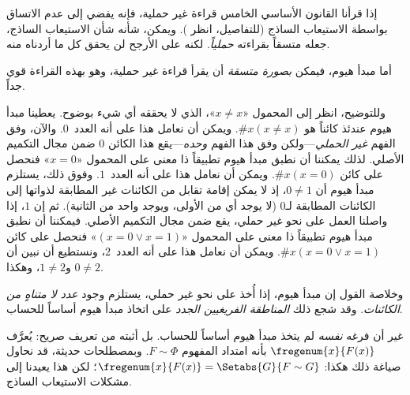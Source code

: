 \documentclass[../../../include/open-logic-section]{subfiles}
\begin{document}
إذا قرأنا القانون الأساسي الخامس قراءة غير حملية، فإنه يفضي إلى عدم
الاتساق بواسطة الاستيعاب الساذج (للتفاصيل، انظر
). ويمكن، شأنه شأن الاستيعاب الساذج، جعله متسقاً
بقراءته \emph{حملياً}. لكنه على الأرجح لن يحقق كل ما أردناه منه.

أما مبدأ هيوم، فيمكن \emph{بصورة متسقة} أن يقرأ قراءة غير حملية، وهو
بهذه القراءة قوي جداً.

وللتوضيح، انظر إلى المحمول «$x \neq x$»، الذي لا يحققه أي شيء بوضوح.
يعطينا مبدأ هيوم عندئذ كائناً هو $\# x( x\neq x)$. ويمكن أن نعامل هذا
على أنه العدد~$0$. والآن، وفق الفهم \emph{غير الحملي}---ولكن وفق هذا
الفهم \emph{وحده}---يقع هذا الكائن $0$ ضمن مجال التكميم الأصلي. لذلك
يمكننا أن نطبق مبدأ هيوم تطبيقاً ذا معنى على المحمول «$x = 0$» فنحصل
على كائن $\#x (x = 0)$. ويمكن أن نعامل هذا على أنه العدد~$1$. وفوق ذلك،
يستلزم مبدأ هيوم أن $0 \neq 1$، إذ لا يمكن إقامة تقابل من الكائنات غير
المطابقة لذواتها إلى الكائنات المطابقة لـ$0$ (لا يوجد أي من الأولى،
ويوجد واحد من الثانية). ثم إن $1$، إذا واصلنا العمل على نحو غير حملي،
يقع ضمن مجال التكميم الأصلي. فيمكننا أن نطبق مبدأ هيوم تطبيقاً ذا معنى
على المحمول «$(x = 0 \lor x = 1)$» فنحصل على كائن
$\#x(x = 0 \lor x = 1)$. ويمكن أن نعامل هذا على أنه العدد~$2$، ونستطيع
أن نبين أن $0\neq 2$ و$1 \neq 2$، وهكذا.

وخلاصة القول إن مبدأ هيوم، إذا أُخذ على نحو غير حملي، يستلزم وجود
\emph{عدد لا متناهٍ من الكائنات}. وقد شجع ذلك
\emph{المناطقة الفريغيين الجدد} على اتخاذ مبدأ هيوم أساساً للحساب.

غير أن فرغه \emph{نفسه} لم يتخذ مبدأ هيوم أساساً للحساب. بل أثبته من
تعريف صريح: يُعرَّف $\fregenum{x}{F(x)}$ بأنه امتداد المفهوم
$F \sim \Phi$. وبمصطلحات حديثة، قد نحاول صياغة ذلك هكذا:
$\fregenum{x}{F(x)} = \Setabs{G}{F \sim G}$؛ لكن هذا يعيدنا إلى مشكلات
الاستيعاب الساذج.
\end{document}
